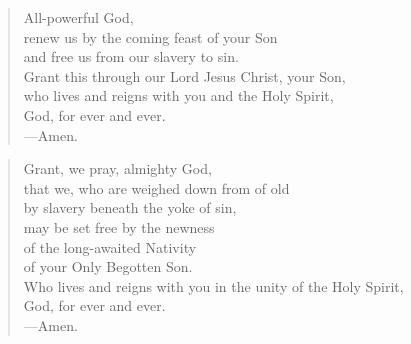 \prayer

\setlength{\vleftmargin}{\prayerleftmargini}

\begin{verse}
All-powerful God,\\
renew us by the coming feast of your Son\\
and free us from our slavery to sin.\\
Grant this through our Lord Jesus Christ, your Son,\\
who lives and reigns with you and the Holy Spirit,\\
God, for ever and ever.\\
{\color{red}---\thinspace}Amen.
\end{verse}


\begin{verse}
Grant, we pray, almighty God,\\
that we, who are weighed down from of old\\
by slavery beneath the yoke of sin,\\
may be set free by the newness\\
of the long-awaited Nativity\\
of your Only Begotten Son.\\
Who lives and reigns with you in the unity of the Holy Spirit,\\
God, for ever and ever.\\
{\color{red}---\thinspace}Amen.

\end{verse}

\setlength{\vleftmargin}{\defleftmargini}